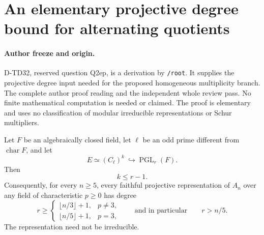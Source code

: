 \section{An elementary projective degree bound for alternating quotients}
\label{sec:projective-abelian-rank}

\paragraph{Author freeze and origin.}
D-TD32, reserved question Q2ep, is a derivation by \texttt{/root}.
It supplies the projective degree input needed for the proposed
homogeneous multiplicity branch. The complete author proof reading
and the independent whole review pass. No finite mathematical
computation is needed or claimed.
The proof is elementary and uses no classification of modular
irreducible representations or Schur multipliers.

\begin{lemma}[D-TD32]
Let $F$ be an algebraically closed field, let $\ell$ be an odd
prime different from $\operatorname{char}F$, and let
\[
                  E\simeq(C_\ell)^k\ \hookrightarrow
                         \operatorname{PGL}_r(F).
 \tag{TDA.1}
\]
Then
\[
                                  k\le r-1.
 \tag{TDA.2}
\]
Consequently, for every $n\ge5$, every faithful projective
representation of $A_n$ over any field of characteristic $p\ge0$
has degree
\[
 r\ge
 \begin{cases}
 \lfloor n/3\rfloor+1,&p\ne3,\\
 \lfloor n/5\rfloor+1,&p=3,
 \end{cases}
 \qquad\text{and in particular}\qquad r>n/5.
 \tag{TDA.3}
\]
The representation need not be irreducible.
\end{lemma}

